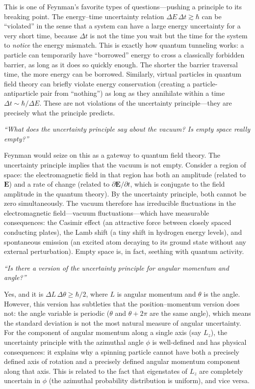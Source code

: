 This is one of Feynman's favorite types of questions---pushing a principle to its breaking point. The energy--time uncertainty relation $\Delta E\,\Delta t \gtrsim \hbar$ can be ``violated'' in the sense that a system can have a large energy uncertainty for a very short time, because $\Delta t$ is not the time you wait but the time for the system to \emph{notice} the energy mismatch. This is exactly how quantum tunneling works: a particle can temporarily have ``borrowed'' energy to cross a classically forbidden barrier, as long as it does so quickly enough. The shorter the barrier traversal time, the more energy can be borrowed. Similarly, virtual particles in quantum field theory can briefly violate energy conservation (creating a particle-antiparticle pair from ``nothing'') as long as they annihilate within a time $\Delta t \sim \hbar/\Delta E$. These are not violations of the uncertainty principle---they are precisely what the principle predicts.

\textit{``What does the uncertainty principle say about the vacuum? Is empty space really empty?''}

Feynman would seize on this as a gateway to quantum field theory. The uncertainty principle implies that the vacuum is not empty. Consider a region of space: the electromagnetic field in that region has both an amplitude (related to $\mathbf{E}$) and a rate of change (related to $\partial\mathbf{E}/\partial t$, which is conjugate to the field amplitude in the quantum theory). By the uncertainty principle, both cannot be zero simultaneously. The vacuum therefore has irreducible fluctuations in the electromagnetic field---vacuum fluctuations---which have measurable consequences: the Casimir effect (an attractive force between closely spaced conducting plates), the Lamb shift (a tiny shift in hydrogen energy levels), and spontaneous emission (an excited atom decaying to its ground state without any external perturbation). Empty space is, in fact, seething with quantum activity.

\textit{``Is there a version of the uncertainty principle for angular momentum and angle?''}

Yes, and it is $\Delta L\,\Delta\theta \geq \hbar/2$, where $L$ is angular momentum and $\theta$ is the angle. However, this version has subtleties that the position--momentum version does not: the angle variable is periodic ($\theta$ and $\theta + 2\pi$ are the same angle), which means the standard deviation is not the most natural measure of angular uncertainty. For the component of angular momentum along a single axis (say $L_z$), the uncertainty principle with the azimuthal angle $\phi$ is well-defined and has physical consequences: it explains why a spinning particle cannot have both a precisely defined axis of rotation and a precisely defined angular momentum component along that axis. This is related to the fact that eigenstates of $L_z$ are completely uncertain in $\phi$ (the azimuthal probability distribution is uniform), and vice versa.

